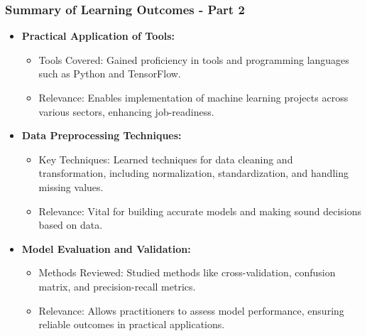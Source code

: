\documentclass[aspectratio=169]{beamer}
\begin{document}
\begin{frame}
    \frametitle{Summary of Learning Outcomes - Part 2}
    \begin{itemize}
        \item \textbf{Practical Application of Tools:}
            \begin{itemize}
                \item Tools Covered: Gained proficiency in tools and programming languages such as Python and TensorFlow.
                \item Relevance: Enables implementation of machine learning projects across various sectors, enhancing job-readiness.
            \end{itemize}

        \item \textbf{Data Preprocessing Techniques:}
            \begin{itemize}
                \item Key Techniques: Learned techniques for data cleaning and transformation, including normalization, standardization, and handling missing values.
                \item Relevance: Vital for building accurate models and making sound decisions based on data.
            \end{itemize}
        
        \item \textbf{Model Evaluation and Validation:}
            \begin{itemize}
                \item Methods Reviewed: Studied methods like cross-validation, confusion matrix, and precision-recall metrics.
                \item Relevance: Allows practitioners to assess model performance, ensuring reliable outcomes in practical applications.
            \end{itemize}
    \end{itemize}
\end{frame}
\end{document}
